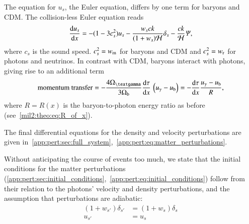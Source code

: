     The equation for $u_{s}$, the Euler equation, differs by one term for baryons and CDM. The collision-less Euler equation reads 
    \begin{equation}\label{mil3:theo:euler_equation}
        \dv{u_s}{x} = -(1- 3c_s^2)u_s - \frac{w_s ck}{(1+w_s)\mathcal{H}} \delta_s - \frac{ck}{\mathcal{H}}\varPsi,
    \end{equation}
    where $c_s$ is the sound speed. $c_s^2 = w_\mathrm{m}$ for baryons and CDM and $c_s^2=w_\mathrm{r}$ for photons and neutrinos. In contrast with CDM, baryons interact with photons, giving rise to an additional term
    \begin{equation}\label{mil3:theo:eq:baryon_momentum_transfer}
        \text{momentum transfer} = - \frac{4\Omega\gped{\textgamma}}{3\Omega\ped{b}}\dv{\tau}{x} \,\left(u_\gamma-u\ped{b}\right)=-\dv{\tau}{x} \frac{u_\gamma-u\ped{b}}{R},
    \end{equation}
    where $R=R(x)$ is the baryon-to-photon energy ratio as before (see~\cref{mil2:theo:eq:R_of_x}). 

    The final differential equations for the density and velocity perturbations are given in~\cref{app:pert:sec:full_system},~\cref{app:pert:eq:matter_perturbations}. 

    Without anticipating the course of events too much, we state that the initial conditions for the matter perturbations (\cref{app:pert:sec:initial_conditions},~\cref{app:pert:eq:initial_conditions}) follow from their relation to the photons' velocity and density perturbations, and the assumption that perturbations are adiabatic:
    \begin{equation}\label{mil3:theo:eq:adiabatic_ic}
    \begin{split}
        \left(1+w_{s'}\right)  \delta_{s'} &= \left(1+w_s\right) \delta_s \\
        u_{s'} &= u_s
    \end{split}
    \end{equation}



